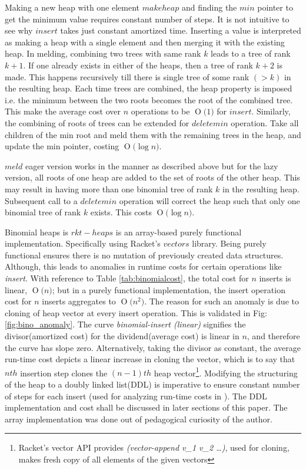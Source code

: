 \documentclass{llncs}
\newcommand{\BigO}[1]{\ensuremath{\operatorname{O}\bigl(#1\bigr)}}
\begin{document}
Making a new heap with one element $makeheap$ and finding the $min$ pointer to get the minimum value requires constant number of steps. It is not intuitive to see why $insert$ takes just constant amortized time. Inserting a value is interpreted as making a heap with a single element and then merging it with the existing heap. In melding, combining two trees with same rank $k$ leads to a tree of rank $k+1$. If one already exists in either of the heaps, then a tree of rank $k+2$ is made. This happens recursively till there is single tree of some rank $(>k)$ in the resulting heap. Each time trees are combined, the heap property is imposed i.e. the minimum between the two roots becomes the root of the combined tree. This make the average cost over $n$ operations to be \BigO{1} for $insert$. Similarly, the combining of roots of trees can be extended for $deletemin$ operation. Take all children of the min root and meld them with the remaining trees in the heap, and update the min pointer, costing \BigO{\log n}.

$meld$ eager version works in the manner as described above but for the lazy version, all roots of one heap are added to the set of roots of the other heap. This may result in having more than one binomial tree of rank $k$ in the resulting heap. Subsequent call to a $deletemin$ operation will correct the heap such that only one binomial tree of rank $k$ exists. This costs \BigO{\log n}.

Binomial heaps is $rkt-heaps$ is an array-based purely functional implementation. Specifically using Racket's $vectors$ library. Being purely functional ensures there is no mutation of previously created data structures. Although, this leads to anomalies in runtime costs for certain operations like \emph{insert}. With reference to Table \ref{tab:binomialcost}, the total cost for $n$ inserts is linear, \BigO{n}; but in a purely functional implementation, the insert operation cost for $n$ inserts aggregates to \BigO{n^2}. The reason for such an anomaly is due to cloning of heap vector at every insert operation. This is validated in Fig:\ref{fig:bino_anomaly}. The curve \emph{binomial-insert (linear)} signifies the divisor(amortized cost) for the dividend(average cost) is linear in $n$, and therefore the curve has slope zero. Alternatively, taking the divisor as constant, the average run-time cost depicts a linear increase in cloning the vector, which is to say that $nth$ insertion step clones the $(n-1)th$ heap vector\footnote{Racket's vector API provides \emph{(vector-append v\_1 v\_2 \dots)}, used for cloning, makes fresh copy of all elements of the given vectors}. Modifying the structuring of the heap to a doubly linked list(DDL) is imperative to ensure constant number of steps for each insert (used for analyzing run-time costs in \cite{kozen1992design}). The DDL implementation and cost shall be discussed in later sections of this paper. The array implementation was done out of pedagogical curiosity of the author.
\end{document}

